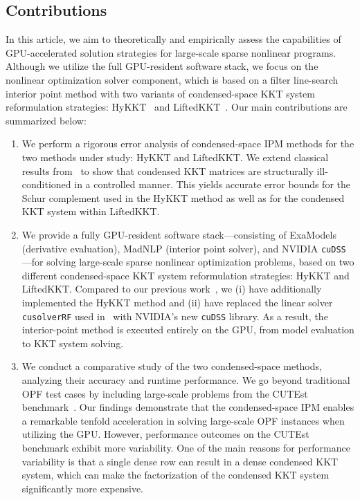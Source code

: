 \documentclass[smallextended]{svjour3}
\begin{document}
\subsection{Contributions}
In this article, we aim to theoretically and empirically assess the capabilities of GPU-accelerated solution strategies for large-scale sparse nonlinear programs.
Although we utilize the full GPU-resident software stack, we focus on the nonlinear optimization solver component, which is based on a filter line-search interior point method with two variants of condensed-space KKT system reformulation strategies: HyKKT~\cite{regev2023hykkt} and LiftedKKT~\cite{shin2023accelerating}.
Our main contributions are summarized below:
\begin{enumerate}
\item We perform a rigorous error analysis of condensed-space IPM methods for the two methods under study: HyKKT and LiftedKKT. We extend classical results from~\cite{wright1998ill} to show that condensed KKT matrices are structurally ill-conditioned in a controlled manner. This yields accurate error bounds for the Schur complement used in the HyKKT method as well as for the condensed KKT system within LiftedKKT.
\item We provide a fully GPU-resident software stack---consisting of ExaModels (derivative evaluation), MadNLP (interior point solver), and NVIDIA {\tt cuDSS} ---for solving large-scale sparse nonlinear optimization problems, based on two different condensed-space KKT system reformulation strategies: HyKKT and LiftedKKT. Compared to our previous work~\cite{shin2023accelerating}, we (i) have additionally implemented the HyKKT method and (ii) have replaced the linear solver {\tt cusolverRF} used in~\cite{shin2023accelerating} with NVIDIA's new {\tt cuDSS} library. As a result, the interior-point method is executed entirely on the GPU, from model evaluation to KKT system solving.
\item We conduct a comparative study of the two condensed-space methods, analyzing their accuracy and runtime performance. We go beyond traditional OPF test cases by including large-scale problems from the CUTEst benchmark~\cite{gould2015cutest}. Our findings demonstrate that the condensed-space IPM enables a remarkable tenfold acceleration in solving large-scale OPF instances when utilizing the GPU. However, performance outcomes on the CUTEst benchmark exhibit more variability. One of the main reasons for performance variability is that a single dense row can result in a dense condensed KKT system, which can make the factorization of the condensed KKT system significantly more expensive.

\end{enumerate}
\end{document}
